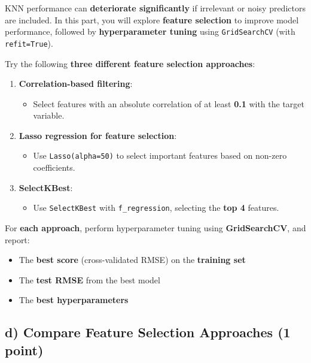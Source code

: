 \documentclass[
  letterpaper,
  DIV=11,
  numbers=noendperiod]{scrreprt}
\providecommand{\tightlist}{%
  \setlength{\itemsep}{0pt}\setlength{\parskip}{0pt}}\usepackage{longtable,booktabs,array}
\begin{document}
KNN performance can \textbf{deteriorate significantly} if irrelevant or
noisy predictors are included. In this part, you will explore
\textbf{feature selection} to improve model performance, followed by
\textbf{hyperparameter tuning} using \texttt{GridSearchCV} (with
\texttt{refit=True}).

Try the following \textbf{three different feature selection approaches}:

\begin{enumerate}
\def\labelenumi{\arabic{enumi}.}
\tightlist
\item
  \textbf{Correlation-based filtering}:

  \begin{itemize}
  \tightlist
  \item
    Select features with an absolute correlation of at least
    \textbf{0.1} with the target variable.
  \end{itemize}
\item
  \textbf{Lasso regression for feature selection}:

  \begin{itemize}
  \tightlist
  \item
    Use \texttt{Lasso(alpha=50)} to select important features based on
    non-zero coefficients.
  \end{itemize}
\item
  \textbf{SelectKBest}:

  \begin{itemize}
  \tightlist
  \item
    Use \texttt{SelectKBest} with \texttt{f\_regression}, selecting the
    \textbf{top 4} features.
  \end{itemize}
\end{enumerate}

For \textbf{each approach}, perform hyperparameter tuning using
\textbf{GridSearchCV}, and report:

\begin{itemize}
\tightlist
\item
  The \textbf{best score} (cross-validated RMSE) on the \textbf{training
  set}
\item
  The \textbf{test RMSE} from the best model
\item
  The \textbf{best hyperparameters}
\end{itemize}

\subsection{\texorpdfstring{d) Compare Feature Selection Approaches
\textbf{(1
point)}}{d) Compare Feature Selection Approaches (1 point)}}\label{d-compare-feature-selection-approaches-1-point}
\end{document}
